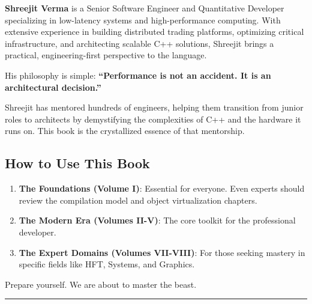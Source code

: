 \textbf{Shreejit Verma} is a Senior Software Engineer and Quantitative
Developer specializing in low-latency systems and high-performance
computing. With extensive experience in building distributed trading
platforms, optimizing critical infrastructure, and architecting scalable
C++ solutions, Shreejit brings a practical, engineering-first
perspective to the language.

His philosophy is simple: \textbf{``Performance is not an accident. It
is an architectural decision.''}

Shreejit has mentored hundreds of engineers, helping them transition
from junior roles to architects by demystifying the complexities of C++
and the hardware it runs on. This book is the crystallized essence of
that mentorship.

\hypertarget{how-to-use-this-book}{%
\subsection{How to Use This Book}\label{how-to-use-this-book}}

\begin{enumerate}
\def\labelenumi{\arabic{enumi}.}
\tightlist
\item
  \textbf{The Foundations (Volume I)}: Essential for everyone. Even
  experts should review the compilation model and object virtualization
  chapters.
\item
  \textbf{The Modern Era (Volumes II-V)}: The core toolkit for the
  professional developer.
\item
  \textbf{The Expert Domains (Volumes VII-VIII)}: For those seeking
  mastery in specific fields like HFT, Systems, and Graphics.
\end{enumerate}

Prepare yourself. We are about to master the beast.

\begin{center}\rule{0.5\linewidth}{0.5pt}\end{center}
